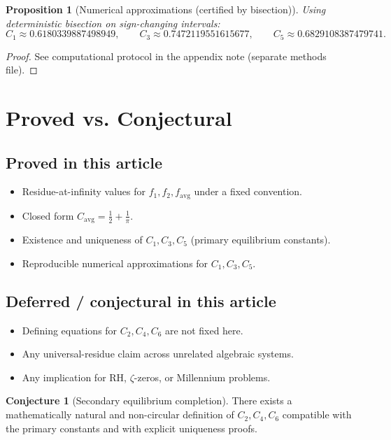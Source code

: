 \documentclass[11pt]{article}
\theoremstyle{definition}
\newtheorem{conjecture}[definition]{Conjecture}
\theoremstyle{plain}
\newtheorem{proposition}[definition]{Proposition}
\begin{document}
\begin{proposition}[Numerical approximations (certified by bisection)]
\label{prop:numerics}
Using deterministic bisection on sign-changing intervals:
\[
C_1\approx 0.6180339887498949,\qquad
C_3\approx 0.7472119551615677,\qquad
C_5\approx 0.6829108387479741.
\]
\end{proposition}
\begin{proof}
See computational protocol in the appendix note (separate methods file).
\end{proof}

\section{Proved vs. Conjectural}
\subsection*{Proved in this article}
\begin{itemize}
\item Residue-at-infinity values for \(f_1,f_2,f_{\mathrm{avg}}\) under a fixed convention.
\item Closed form \(C_{\mathrm{avg}}=\frac12+\frac1\pi\).
\item Existence and uniqueness of \(C_1,C_3,C_5\) (primary equilibrium constants).
\item Reproducible numerical approximations for \(C_1,C_3,C_5\).
\end{itemize}

\subsection*{Deferred / conjectural in this article}
\begin{itemize}
\item Defining equations for \(C_2,C_4,C_6\) are not fixed here.
\item Any universal-residue claim across unrelated algebraic systems.
\item Any implication for RH, \(\zeta\)-zeros, or Millennium problems.
\end{itemize}

\begin{conjecture}[Secondary equilibrium completion]
There exists a mathematically natural and non-circular definition of
\(C_2,C_4,C_6\) compatible with the primary constants and with explicit uniqueness proofs.
\end{conjecture}
\end{document}
